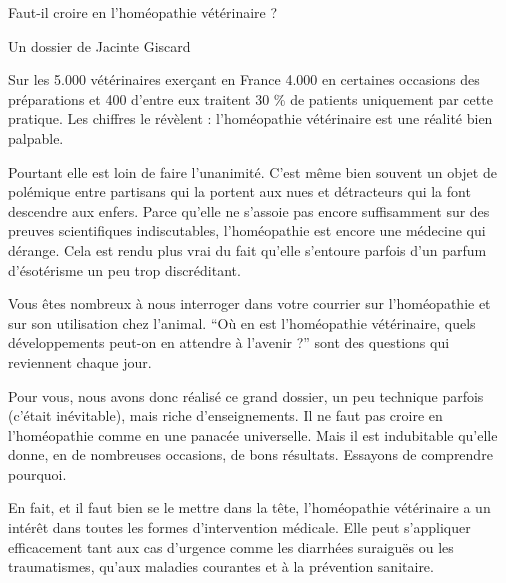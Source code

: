 
Faut-il croire en l'homéopathie vétérinaire ?

Un dossier de Jacinte Giscard

Sur les 5.000 vétérinaires exerçant en France 4.000
 en certaines occasions des préparations
 et 400 d'entre eux traitent 30 \% de
 patients uniquement par cette pratique. Les chiffres le révèlent : l'homéopathie vétérinaire est une réalité bien palpable.

Pourtant elle est loin de faire l'unanimité. C'est
même bien souvent un objet de polémique entre partisans qui la portent aux nues et détracteurs qui la font
descendre aux enfers. Parce qu'elle ne s'assoie pas
encore suffisamment sur des preuves scientifiques
indiscutables, l'homéopathie est encore une médecine
qui dérange. Cela est rendu plus vrai du fait qu'elle
s'entoure parfois d'un parfum d'ésotérisme un peu trop
discréditant.

Vous êtes nombreux à nous interroger dans votre
courrier sur l'homéopathie et sur son utilisation chez
l'animal. ``Où en est l'homéopathie vétérinaire, quels
développements peut-on en attendre à l'avenir ?'' sont
des questions qui reviennent chaque jour.

Pour vous, nous avons donc réalisé ce grand dossier, un peu technique parfois (c'était inévitable), mais
riche d'enseignements. Il ne faut pas croire en l'homéopathie comme en une panacée universelle. Mais il est
indubitable qu'elle donne, en de nombreuses occasions, de bons résultats. Essayons de comprendre
pourquoi.




En fait, et il faut bien se le
mettre dans la tête, l'homéopathie vétérinaire a un intérêt dans toutes les formes
d'intervention médicale. Elle
peut s'appliquer efficacement tant aux cas d'urgence
comme les diarrhées suraiguës ou les traumatismes,
qu'aux maladies courantes
et à la prévention sanitaire.

